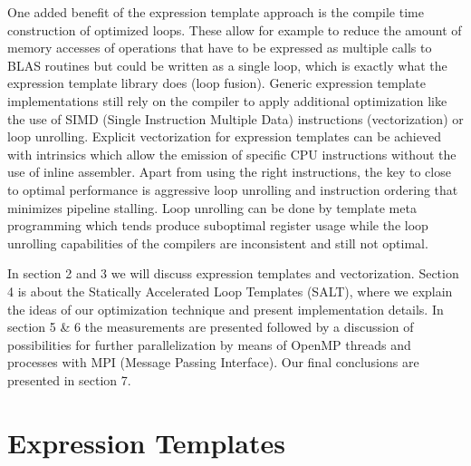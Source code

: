 \documentclass[12pt]{article}
\begin{document}
One added benefit of the
expression template approach is the compile time construction of optimized
loops. These allow for example to reduce the amount of memory accesses of operations that
have to be expressed as multiple calls to BLAS routines but could be written as
a single loop, which is exactly what the expression template library does (loop
fusion). Generic expression template implementations still rely on the compiler
to apply additional optimization like the use of SIMD (Single Instruction Multiple Data)
instructions (vectorization) or loop unrolling. Explicit vectorization for expression templates
can be achieved with intrinsics which allow the emission of specific CPU
instructions without the use of inline assembler. Apart from using the right
instructions, the key to close to optimal performance is aggressive loop
unrolling and instruction ordering that minimizes pipeline stalling. Loop
unrolling can be done by template meta programming which tends produce suboptimal
register usage while the loop unrolling capabilities of the compilers are
inconsistent and still not optimal.

In section 2 and 3 we will discuss expression templates and vectorization. Section
4 is about the Statically Accelerated Loop Templates (SALT), where we explain
the ideas of our optimization technique and present implementation details.
In section 5 \& 6 the measurements are presented followed by a discussion of possibilities
for further parallelization by means of OpenMP threads and processes with MPI
(Message Passing Interface).  Our final conclusions are presented in section 7.
\section{Expression Templates}
\end{document}
